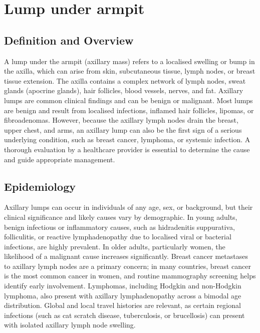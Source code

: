\chapter{Lump under armpit}

\section*{Definition and Overview}
A lump under the armpit (axillary mass) refers to a localised swelling or bump in the axilla, which can arise from skin, subcutaneous tissue, lymph nodes, or breast tissue extension. The axilla contains a complex network of lymph nodes, sweat glands (apocrine glands), hair follicles, blood vessels, nerves, and fat. Axillary lumps are common clinical findings and can be benign or malignant. Most lumps are benign and result from localised infections, inflamed hair follicles, lipomas, or fibroadenomas. However, because the axillary lymph nodes drain the breast, upper chest, and arms, an axillary lump can also be the first sign of a serious underlying condition, such as breast cancer, lymphoma, or systemic infection. A thorough evaluation by a healthcare provider is essential to determine the cause and guide appropriate management.

\section*{Epidemiology}
Axillary lumps can occur in individuals of any age, sex, or background, but their clinical significance and likely causes vary by demographic. In young adults, benign infectious or inflammatory causes, such as hidradenitis suppurativa, folliculitis, or reactive lymphadenopathy due to localised viral or bacterial infections, are highly prevalent. In older adults, particularly women, the likelihood of a malignant cause increases significantly. Breast cancer metastases to axillary lymph nodes are a primary concern; in many countries, breast cancer is the most common cancer in women, and routine mammography screening helps identify early involvement. Lymphomas, including Hodgkin and non-Hodgkin lymphoma, also present with axillary lymphadenopathy across a bimodal age distribution. Global and local travel histories are relevant, as certain regional infections (such as cat scratch disease, tuberculosis, or brucellosis) can present with isolated axillary lymph node swelling.

